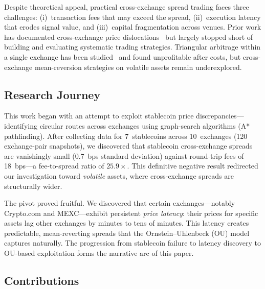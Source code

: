 \documentclass[sigconf,nonacm=false]{acmart}
\begin{document}
Despite theoretical appeal, practical cross-exchange spread trading faces three challenges: (i)~transaction fees that may exceed the spread, (ii)~execution latency that erodes signal value, and (iii)~capital fragmentation across venues. Prior work has documented cross-exchange price dislocations~\cite{makarov2020trading, gandal2021key} but largely stopped short of building and evaluating systematic trading strategies. Triangular arbitrage within a single exchange has been studied~\cite{fischler2024wish} and found unprofitable after costs, but cross-exchange mean-reversion strategies on volatile assets remain underexplored.

\subsection{Research Journey}

This work began with an attempt to exploit stablecoin price discrepancies---identifying circular routes across exchanges using graph-search algorithms (A* pathfinding). After collecting data for 7~stablecoins across 10~exchanges (120 exchange-pair snapshots), we discovered that stablecoin cross-exchange spreads are vanishingly small (0.7~bps standard deviation) against round-trip fees of 18~bps---a fee-to-spread ratio of $25.9\times$. This definitive negative result redirected our investigation toward \emph{volatile} assets, where cross-exchange spreads are structurally wider.

The pivot proved fruitful. We discovered that certain exchanges---notably Crypto.com and MEXC---exhibit persistent \emph{price latency}: their prices for specific assets lag other exchanges by minutes to tens of minutes. This latency creates predictable, mean-reverting spreads that the Ornstein--Uhlenbeck (OU) model captures naturally. The progression from stablecoin failure to latency discovery to OU-based exploitation forms the narrative arc of this paper.

\subsection{Contributions}
\end{document}
